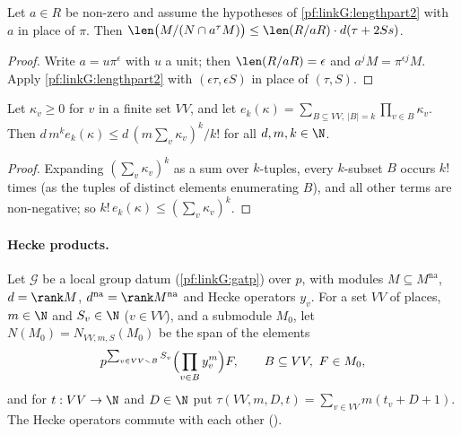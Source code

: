 \begin{corollary}\label{pf:linkG:lengthallbut}
Let $a\in R$ be non-zero and assume the hypotheses of \cref{pf:linkG:lengthpart2} with $a$ in place of $\pi$. Then
$\len\bigl(M/(N\cap a^\tau M)\bigr)\le\len(R/aR)\cdot d(\tau+2Ss)$.
\end{corollary}

\begin{proof}
Write $a=u\pi^\epsilon$ with $u$ a unit; then $\len(R/aR)=\epsilon$ and $a^jM=\pi^{\epsilon j}M$. Apply
\cref{pf:linkG:lengthpart2} with $(\epsilon\tau,\epsilon S)$ in place of $(\tau,S)$.
\end{proof}

\begin{lemma}\label{pf:linkG:esymm}
Let $\kappa_v\ge0$ for $v$ in a finite set $VV$, and let $e_k(\kappa)=\sum_{B\subseteq VV,\ |B|=k}\prod_{v\in B}\kappa_v$.
Then $d\,m^ke_k(\kappa)\le d\,(m\sum_v\kappa_v)^k/k!$ for all $d,m,k\in\N$.
\end{lemma}

\begin{proof}
Expanding $(\sum_v\kappa_v)^k$ as a sum over $k$-tuples, every $k$-subset $B$ occurs $k!$ times (as the tuples of
distinct elements enumerating $B$), and all other terms are non-negative; so $k!\,e_k(\kappa)\le(\sum_v\kappa_v)^k$.
\end{proof}

\paragraph{Hecke products.}
Let $\mathcal G$ be a local group datum (\cref{pf:linkG:gatp}) over $p$, with modules $M\subseteq M^{\mathrm{na}}$,
$d=\rank M$, $d^{\mathrm{na}}=\rank M^{\mathrm{na}}$ and Hecke operators $y_v$. For a set $VV$ of places, $m\in\N$ and
$S_v\in\N$ ($v\in VV$), and a submodule $M_0$, let $N(M_0)=N_{VV,m,S}(M_0)$ be the span of the elements
\[
p^{\sum_{v\in VV\smallsetminus B}S_v}\Bigl(\prod_{v\in B}y_v^m\Bigr)F,\qquad B\subseteq VV,\ F\in M_0,
\]
and for $t:VV\to\N$ and $D\in\N$ put $\tau(VV,m,D,t)=\sum_{v\in VV}m(t_v+D+1)$. The Hecke operators commute with each
other ().

